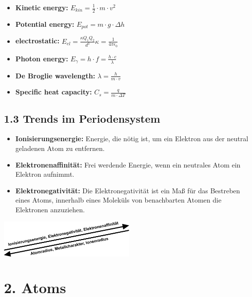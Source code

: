\begin{multicols*}{4}
{    \begin{itemize}[noitemsep, leftmargin=*]
        \item \textbf{Kinetic energy:} $E_{kin} = \frac{1}{2} \cdot m \cdot v^2$
        \item \textbf{Potential energy:} $E_{pot} = m \cdot g \cdot \Delta h$
        \item \textbf{electrostatic:} $E_{el}=\frac{\kappa Q_1Q_2}{d^3}$\quad $\kappa = \frac{1}{4\pi \epsilon_0}$
        \item \textbf{Photon energy: } $E_\gamma = h\cdot f = \frac{h\cdot c}{\lambda}$
        \item \textbf{De Broglie wavelength: } $\lambda = \frac{h}{m\cdot v}$
        \item \textbf{Specific heat capacity: }$C_s=\frac{q}{m\cdot\Delta T}$
    \end{itemize}
}


\subsection{1.3 Trends im Periodensystem}{
\begin{itemize}[noitemsep, leftmargin=*]
    \item \textbf{Ionisierungsenergie: }Energie, die nötig ist, um ein Elektron aus der neutral geladenen Atom zu entfernen.
    \item \textbf{Elektronenaffinität:} Frei werdende Energie, wenn ein neutrales Atom ein Elektron aufnimmt.
    \item \textbf{Elektronegativität:} Die Elektronegativität ist ein Maß für das Bestreben eines Atoms, innerhalb eines Moleküls von benachbarten Atomen die Elektronen anzuziehen.

    
\end{itemize}\includegraphics[width = 68mm]{Bilder/TrendsimPSE.png}
}

\section{2. Atoms}

\end{multicols*}
